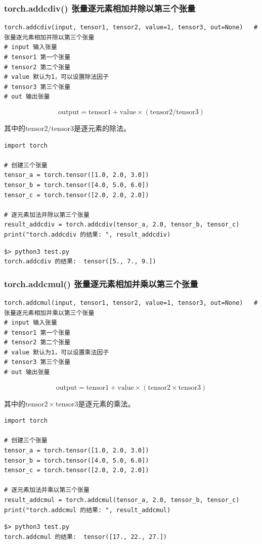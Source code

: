 \subsubsection{torch.addcdiv() 张量逐元素相加并除以第三个张量}
\begin{lstlisting}[style=demostyle,numbers=none]
torch.addcdiv(input, tensor1, tensor2, value=1, tensor3, out=None)   # 张量逐元素相加并除以第三个张量
# input 输入张量
# tensor1 第一个张量
# tensor2 第二个张量
# value 默认为1，可以设置除法因子
# tensor3 第三个张量
# out 输出张量
\end{lstlisting}
$$\mathrm{output}=\text{tensor}1+\mathrm{value}\times(\text{tensor}2/\text{tensor}3)$$

其中的$\text{tensor}2/\text{tensor}3$是\textcolor{YBXPurple}{逐元素}的除法。

\begin{lstlisting}[style=pythonstyle]
import torch

# 创建三个张量
tensor_a = torch.tensor([1.0, 2.0, 3.0])
tensor_b = torch.tensor([4.0, 5.0, 6.0])
tensor_c = torch.tensor([2.0, 2.0, 2.0])

# 逐元素加法并除以第三个张量
result_addcdiv = torch.addcdiv(tensor_a, 2.0, tensor_b, tensor_c)
print("torch.addcdiv 的结果: ", result_addcdiv)
\end{lstlisting}

\begin{lstlisting}[style=demostyle,numbers=none]
$> python3 test.py
torch.addcdiv 的结果:  tensor([5., 7., 9.])
\end{lstlisting}

\subsubsection{torch.addcmul() 张量逐元素相加并乘以第三个张量}
\begin{lstlisting}[style=demostyle,numbers=none]
torch.addcmul(input, tensor1, tensor2, value=1, tensor3, out=None)   # 张量逐元素相加并乘以第三个张量
# input 输入张量
# tensor1 第一个张量
# tensor2 第二个张量
# value 默认为1，可以设置乘法因子
# tensor3 第三个张量
# out 输出张量
\end{lstlisting}
$$\mathrm{output}=\text{tensor}1+\mathrm{value}\times(\text{tensor}2\times\text{tensor}3)$$

其中的$\text{tensor}2\times\text{tensor}3$是\textcolor{YBXPurple}{逐元素}的乘法。

\begin{lstlisting}[style=pythonstyle]
import torch

# 创建三个张量
tensor_a = torch.tensor([1.0, 2.0, 3.0])
tensor_b = torch.tensor([4.0, 5.0, 6.0])
tensor_c = torch.tensor([2.0, 2.0, 2.0])

# 逐元素加法并乘以第三个张量
result_addcmul = torch.addcmul(tensor_a, 2.0, tensor_b, tensor_c)
print("torch.addcmul 的结果: ", result_addcmul)
\end{lstlisting}
\begin{lstlisting}[style=demostyle,numbers=none]
$> python3 test.py
torch.addcmul 的结果:  tensor([17., 22., 27.])
\end{lstlisting}

